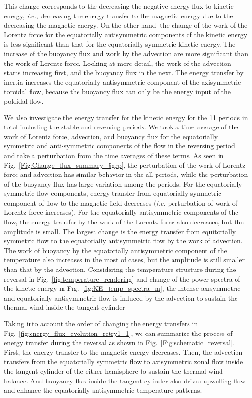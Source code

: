 This change corresponds to the decreasing the negative energy flux to kinetic energy, {\it i.e.}, decreasing the energy transfer to the magnetic energy due to the decreasing the magnetic energy. 
On the other hand, the change of the work of the Lorentz force for the equatorially antisymmetric components of the kinetic energy is less significant than that for the equatorially symmetric kinetic energy. 
The increase of the buoyancy flux and work by the advection are more significant than the work of Lorentz force. 
Looking at more detail, the work of the advection starts increasing first, and the buoyancy flux in the next. 
The energy transfer by inertia increases the equatorially antisymmetric component of the axisymmetric toroidal flow, because the buoyancy flux can only be the energy input of the poloidal flow.

We also investigate the energy 
{\color{red} transfer}
for the kinetic energy for the 11 periods in total including the stable and reversing periods. 
We took a time average of the work of Lorentz force, advection, and buoyancy flux for the equatorially symmetric and anti-symmetric components of the flow in the reversing period, and take a perturbation from the time averages of these terms. 
As seen in Fig.~\ref{Fig:Change_flux_summary_6grp}, the perturbation of the work of Lorentz force and advection has similar behavior in the all periods, while the perturbation of the buoyancy flux has large variation among the periods.
For the equatorially symmetric flow components, energy transfer from equatorially symmetric component of flow to the magnetic field decreases ({\it i.e.} perturbation of work of Lorentz force increases). 
For the equatorially antisymmetric components of the flow, the energy transfer by the work of the Lorentz force also decreases, but the amplitude is small. 
The largest change is the energy transfer from equitorially symmetric flow to the equatorially antisymmetric flow by the work of advection. 
The work of buoyancy by the equatorially antisymmetric component of the temperature also increases in the most of cases, but the amplitude is still smaller than that by the advection. 
Considering the temperature structure during the reversal in Fig.~\ref{fig:temperature_rendering} and change of the power spectra of the kinetic energy in Fig.~\ref{fig:KE_temp_spectra_m}, the intense axisymmetric and equatorially antisymmetric flow is induced by the advection to sustain the thermal wind inside the tangent cylinder. 

Taking into account the order of changing the energy 
{\color{red} transfers}
in Fig.~\ref{fig:energy_flux_evolution_retry1_1}, we can summarize the process of energy transfer during the reversal as shown in Fig.~\ref{Fig:schematic_reversal}. 
First, the energy transfer to the magnetic energy decreases. 
Then, the advection transfers from the equatorially symmetric flow to axisymmetric zonal flow inside the tangent cylinder of the either hemisphere to sustain the thermal wind balance. 
And buoyancy flux inside the tangent cylinder also drives upwelling flow and enhance the equatorially antisymmetric temperature patterns.

